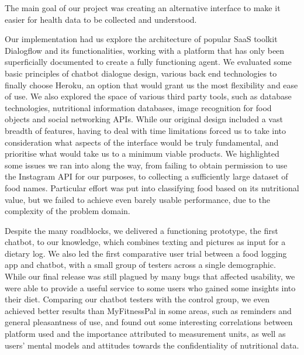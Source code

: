 The main goal of our project was creating an alternative interface to make it easier for health data to be collected and understood.

Our implementation had us explore the architecture of popular SaaS toolkit Dialogflow and its functionalities, working with a platform that has only been superficially documented to create a fully functioning agent. We evaluated some basic principles of chatbot dialogue design, various back end technologies to finally choose Heroku, an option that would grant us the most flexibility and ease of use. We also explored the space of various third party tools, such as database technologies, nutritional information databases, image recognition for food objects and social networking APIs. While our original design included a vast breadth of features, having to deal with time limitations forced us to take into consideration what aspects of the interface would be truly fundamental, and prioritise what would take us to a minimum viable products. We highlighted some issues we ran into along the way, from failing to obtain permission to use the Instagram API for our purposes, to collecting a sufficiently large dataset of food names. Particular effort was put into classifying food based on its nutritional value, but we failed to achieve even barely usable performance, due to the complexity of the problem domain.

Despite the many roadblocks, we delivered a functioning prototype, the first chatbot, to our knowledge, which combines texting and pictures as input for a dietary log. We also led the first comparative user trial between a food logging app and chatbot, with a small group of testers across a single demographic. \\
While our final release was still plagued by many bugs that affected usability, we were able to provide a useful service to some users who gained some insights into their diet. Comparing our chatbot testers with the control group, we even achieved better results than MyFitnessPal in some areas, such as reminders and general pleasantness of use, and found out some interesting correlations between platform used and the importance attributed to measurement units, as well as users' mental models and attitudes towards the confidentiality of nutritional data. 

